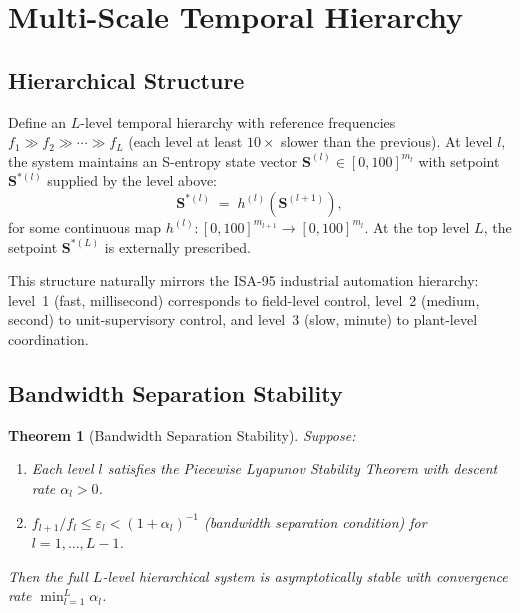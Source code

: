 \documentclass[10pt,twocolumn]{article}
\theoremstyle{plain}
\newtheorem{theorem}{Theorem}[section]
\theoremstyle{definition}
\theoremstyle{remark}
\begin{document}
\section{Multi-Scale Temporal Hierarchy}
\label{sec:hierarchy}

\subsection{Hierarchical Structure}
\label{ssec:hierstr}

Define an $L$-level temporal hierarchy with reference frequencies
$f_1 \gg f_2 \gg \cdots \gg f_L$ (each level at least $10\times$ slower
than the previous).  At level $l$, the system maintains an S-entropy
state vector $\mathbf{S}^{(l)} \in [0,100]^{m_l}$ with setpoint
$\mathbf{S}^{*(l)}$ supplied by the level above:
\begin{equation}
  \mathbf{S}^{*(l)} \;=\; h^{(l)}\!\left(\mathbf{S}^{(l+1)}\right),
  \label{eq:hiersp}
\end{equation}
for some continuous map $h^{(l)}: [0,100]^{m_{l+1}} \to [0,100]^{m_l}$.
At the top level $L$, the setpoint $\mathbf{S}^{*(L)}$ is externally
prescribed.

This structure naturally mirrors the ISA-95 industrial automation
hierarchy: level~1 (fast, millisecond) corresponds to field-level
control, level~2 (medium, second) to unit-supervisory control, and
level~3 (slow, minute) to plant-level coordination.

\subsection{Bandwidth Separation Stability}
\label{ssec:bws}

\begin{theorem}[Bandwidth Separation Stability]
\label{thm:hier}
Suppose:
\begin{enumerate}
  \item[(i)] Each level $l$ satisfies the Piecewise Lyapunov Stability
    Theorem with descent rate $\alpha_l > 0$.
  \item[(ii)] $f_{l+1}/f_l \leq \varepsilon_l < (1 + \alpha_l)^{-1}$
    (bandwidth separation condition) for $l = 1,\ldots,L-1$.
\end{enumerate}
Then the full $L$-level hierarchical system is asymptotically stable
with convergence rate $\min_{l=1}^L \alpha_l$.
\end{theorem}
\end{document}
